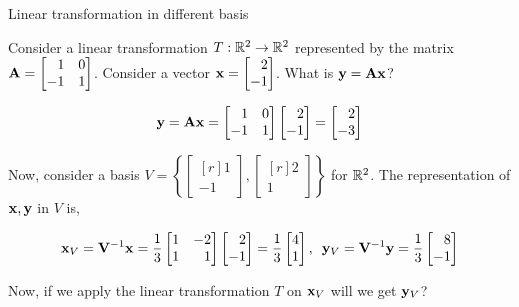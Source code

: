 \documentclass[aspectratio=169]{beamer}
\def\mf{\ensuremath\mathbf}
\def\mb{\ensuremath\mathbb}
\begin{document}
\begin{frame}[t]{Linear transformation in different basis}
\begin{small}
Consider a linear transformation $T: \mb{R}^2 \to \mb{R}^2$ represented by the matrix $\mf{A} = \begin{bmatrix*}[r]1 & 0\\-1 & 1\end{bmatrix*}$. Consider a vector $\mf{x} = \begin{bmatrix*}[r]2\\-1\end{bmatrix*}$. What is $\mf{y} = \mf{Ax}$?

\[ \mf{y} = \mf{Ax} = \begin{bmatrix*}[r]1 & 0\\-1 & 1\end{bmatrix*}\begin{bmatrix*}[r]2\\-1\end{bmatrix*} = \begin{bmatrix*}[r]2\\-3\end{bmatrix*} \]

Now, consider a basis $V = \left\{\begin{bmatrix*}[r]1\\-1\end{bmatrix*}, \begin{bmatrix*}[r]2\\1\end{bmatrix*}\right\}$ for $\mb{R}^2$. The representation of $\mf{x}, \mf{y}$ in $V$ is, 

\[ \mf{x}_V = \mf{V}^{-1}\mf{x} = \frac{1}{3}\begin{bmatrix*}[r]1 & -2\\1 & 1\end{bmatrix*}\begin{bmatrix*}[r]2\\-1\end{bmatrix*} = \frac{1}{3}\begin{bmatrix*}[r]4\\1\end{bmatrix*}, \,\,\, \mf{y}_V = \mf{V}^{-1}\mf{y} = \frac{1}{3}\begin{bmatrix*}[r]8\\-1\end{bmatrix*}\]

Now, if we apply the linear transformation $T$ on $\mf{x}_V$ will we get $\mf{y}_V$?


\end{small}
\end{frame}
\end{document}
